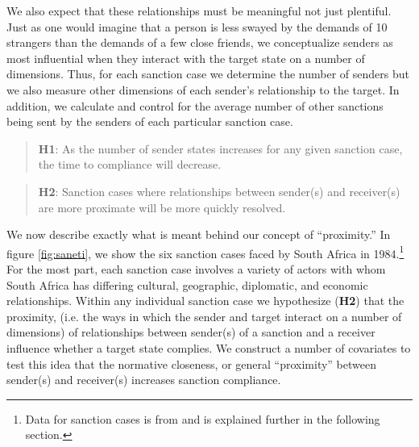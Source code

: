 We also expect that these relationships must be meaningful not just plentiful. Just as one would imagine that a person is less swayed by the demands of 10 strangers than the demands of a few close friends, we conceptualize senders as most influential when they interact with the target state on a number of dimensions.  Thus, for each sanction case we determine the number of senders but we also measure other dimensions of each sender's relationship to the target. In addition, we calculate and control for the average number of other sanctions being sent by the senders of each particular sanction case.

\begin{quote}
	\textbf{H1}: As the number of sender states increases for any given sanction case, the time to compliance will decrease. 
\end{quote}

\begin{quote}
	\textbf{H2}: Sanction cases where relationships between sender(s) and receiver(s) are more proximate will be more quickly resolved.
\end{quote}

 We now describe exactly what is meant behind our concept of ``proximity.'' In figure \ref{fig:saneti}, we show the six sanction cases faced by South Africa in 1984.\footnote{Data for sanction cases is from \citet{morgan2009threat} and is explained further in the following section.} For the most part, each sanction case involves a variety of actors with whom South Africa has differing cultural, geographic, diplomatic, and economic relationships. Within any individual sanction case we hypothesize (\textbf{H2}) that the proximity, (i.e. the ways in which the sender and target interact on a number of dimensions) of relationships between sender(s) of a sanction and a receiver influence whether a target state complies. We construct a number of covariates to test this idea that the normative closeness, or general ``proximity'' between sender(s) and receiver(s) increases sanction compliance. 

